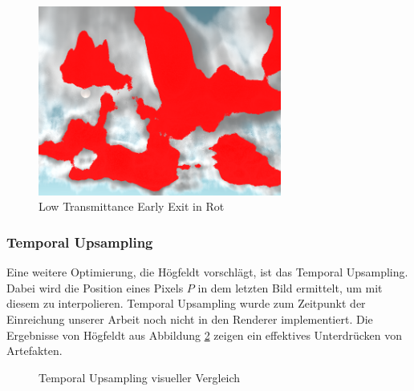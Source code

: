 \begin{figure}[H]
    \centering
    \includegraphics[width=8cm]{figures/early-exit.png}
    \caption{Low Transmittance Early Exit in Rot}
    \label{fig:low-early-exit}
\end{figure}

\subsubsection{Temporal Upsampling}
Eine weitere Optimierung, die Högfeldt \cite{Högfeldt16} vorschlägt, ist das Temporal Upsampling. Dabei wird die Position eines Pixels $ P $ in dem letzten Bild ermittelt, um mit diesem zu interpolieren. Temporal Upsampling wurde zum Zeitpunkt der Einreichung unserer Arbeit noch nicht in den Renderer implementiert. Die Ergebnisse von Högfeldt aus Abbildung \ref{fig:temporal-upsampling} zeigen ein effektives Unterdrücken von Artefakten.

\begin{figure}[H]
    \centering
    \qquad
    \caption{Temporal Upsampling visueller Vergleich \cite{Högfeldt16}}
    \label{fig:temporal-upsampling}
\end{figure}

